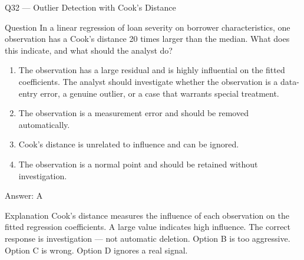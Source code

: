 \documentclass[aspectratio=169,8pt]{beamer}
\begin{document}
	\begin{frame}{Q32 --- Outlier Detection with Cook's Distance}
		\begin{block}{Question}
			In a linear regression of loan severity on borrower characteristics, one observation has a Cook's distance 20 times larger than the median. What does this indicate, and what should the analyst do?
		\end{block}
		\begin{enumerate}
			\item The observation has a large residual and is highly influential on the fitted coefficients. The analyst should investigate whether the observation is a data-entry error, a genuine outlier, or a case that warrants special treatment.
			\item The observation is a measurement error and should be removed automatically.
			\item Cook's distance is unrelated to influence and can be ignored.
			\item The observation is a normal point and should be retained without investigation.
		\end{enumerate}
		\begin{exampleblock}{Answer: A}\end{exampleblock}
		\begin{block}{Explanation}
			Cook's distance measures the influence of each observation on the fitted regression coefficients. A large value indicates high influence. The correct response is investigation --- not automatic deletion. Option B is too aggressive. Option C is wrong. Option D ignores a real signal.
		\end{block}
	\end{frame}
	
\end{document}
